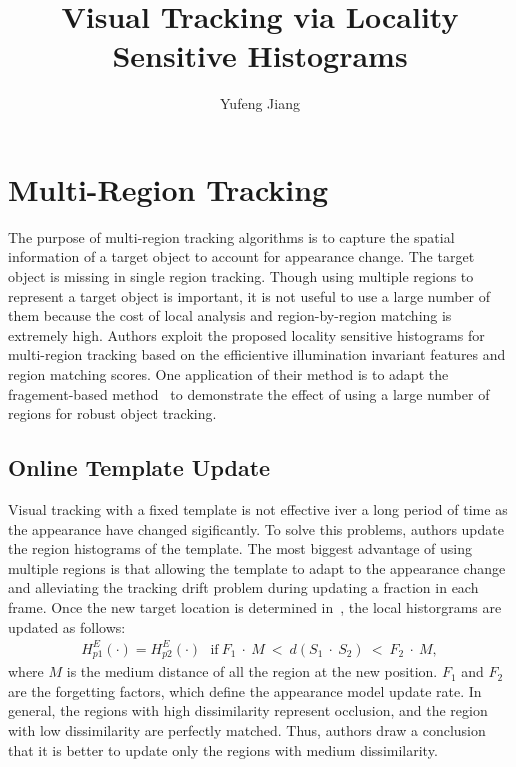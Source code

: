 \documentclass[10pt,twocolumn,letterpaper]{article}
\begin{document}
\title{Visual Tracking via Locality Sensitive Histograms}
\author{Yufeng Jiang}
\maketitle

\section{Multi-Region Tracking}

The purpose of multi-region tracking algorithms is to capture the spatial information of a target object to account for appearance change. The target object is missing in single region tracking. Though using multiple regions to represent a target object is important, it is not useful to use a large number of them because the cost of local analysis and region-by-region matching is extremely high. Authors exploit the proposed locality sensitive histograms for multi-region tracking based on the efficientive illumination invariant features and region matching scores. One application of their method is to adapt the fragement-based method~\cite{Robust} to demonstrate the effect of using a large number of regions for robust object tracking.

\subsection{Online Template Update}

Visual tracking with a fixed template is not effective iver a long period of time as the appearance have changed sigificantly. To solve this problems, authors update the region histograms of the template. The most biggest advantage of using multiple regions is that allowing the template to adapt to the appearance change and alleviating the tracking drift problem during updating a fraction in each frame. Once the new target location is determined in~\cite{via}, the local historgrams are updated as follows:\\
\begin{gather}
H_{p1}^E(\cdot) = H_{p2}^E(\cdot)~~~\text{if}~F_1~\cdot~M~<~d(S_1~\cdot~S_2)~<~F_2~\cdot~M,
\label{eq1}
\end{gather}
where $M$ is the medium distance of all the region at the new position. $F_1$ and $F_2$ are the forgetting factors, which define the appearance model update rate. In general, the regions with high dissimilarity represent occlusion, and the region with low dissimilarity are perfectly matched. Thus, authors draw a conclusion that it is better to update only the regions with medium dissimilarity. 
\end{document}
